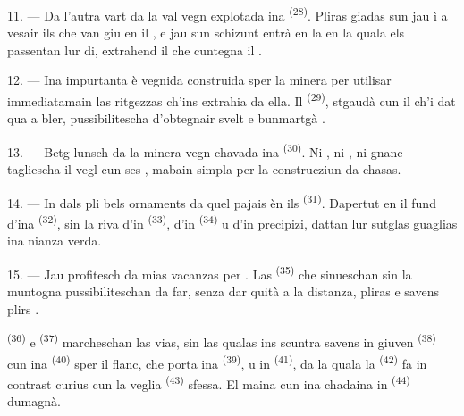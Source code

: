 11. --- Da l'autra vart da la val vegn explotada ina 
\textsuperscript{(28)}. Pliras giadas sun jau ì a vesair ils  che van
giu en il , e jau sun schizunt entrà en la  en la quala els
passentan lur di, extrahend il  che cuntegna il .

12. --- Ina impurtanta  è vegnida construida sper la minera per
utilisar immediatamain las ritgezzas ch'ins extrahia da ella. Il 
\textsuperscript{(29)}, stgaudà cun il  ch'i dat qua a bler,
pussibilitescha d'obtegnair svelt e bunmartgà .

13. --- Betg lunsch da la minera vegn chavada ina 
\textsuperscript{(30)}. Ni , ni , ni gnanc  tagliescha il vegl  cun ses , mabain simpla
 per la construcziun da chasas.

14. --- In dals pli bels ornaments da quel pajais èn ils 
\textsuperscript{(31)}. Dapertut en il fund d'ina  \textsuperscript{(32)},
sin la riva d'in  \textsuperscript{(33)}, d'in 
\textsuperscript{(34)} u d'in precipizi, dattan lur sutglas guaglias ina nianza verda.

\VUsaut{3.0mm}
\VUsaut{3.0mm}

15. --- Jau profitesch da mias vacanzas per . Las
 \textsuperscript{(35)} che sinueschan sin la muntogna pussibiliteschan da far,
senza dar quità a la distanza, pliras  e savens plirs
.

 \textsuperscript{(36)} e  \textsuperscript{(37)}
marcheschan las vias, sin las qualas ins scuntra savens in giuven 
\textsuperscript{(38)} cun ina  \textsuperscript{(40)} sper il flanc, che
porta ina  \textsuperscript{(39)}, u in 
\textsuperscript{(41)}, da la quala la  \textsuperscript{(42)}
fa in contrast curius cun la veglia  \textsuperscript{(43)} sfessa. El
maina cun ina chadaina in  \textsuperscript{(44)} dumagnà.

